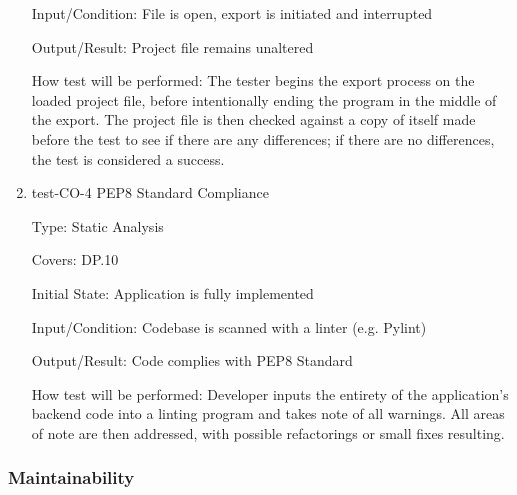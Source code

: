 \documentclass[12pt, titlepage]{article}
\begin{document}
\begin{enumerate}
Input/Condition: File is open, export is initiated and interrupted
					
Output/Result: Project file remains unaltered
					
How test will be performed: The tester begins the export process on the loaded project file, before intentionally ending the program
in the middle of the export. The project file is then checked against a copy of itself made before the test to see if there are any differences;
if there are no differences, the test is considered a success. 

\item{test-CO-4 PEP8 Standard Compliance\\}

Type: Static Analysis

Covers: DP.10
					
Initial State: Application is fully implemented
					
Input/Condition: Codebase is scanned with a linter (e.g. Pylint) %
					
Output/Result: Code complies with PEP8 Standard
					
How test will be performed: Developer inputs the entirety of the application's backend code into a linting program and takes note of all
warnings. All areas of note are then addressed, with possible refactorings or small fixes resulting.

\end{enumerate}

\subsubsection{Maintainability}
\end{document}
